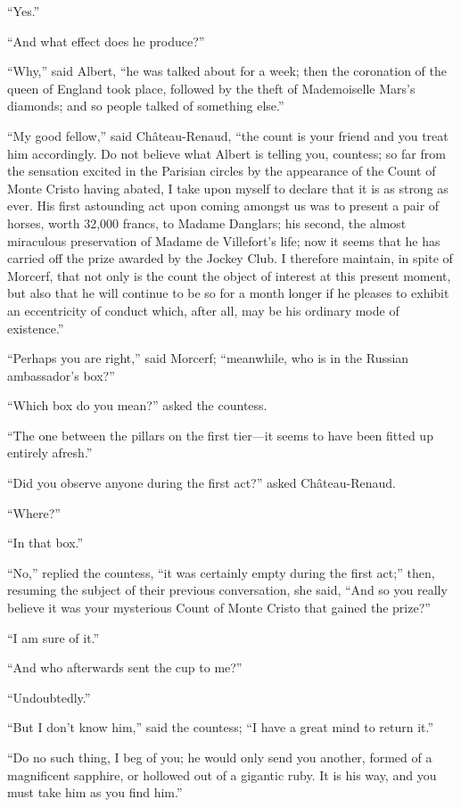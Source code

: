 “Yes.”

“And what effect does he produce?”

“Why,” said Albert, “he was talked about for a week; then the
coronation of the queen of England took place, followed by the theft of
Mademoiselle Mars’s diamonds; and so people talked of something else.”

“My good fellow,” said Château-Renaud, “the count is your friend and
you treat him accordingly. Do not believe what Albert is telling you,
countess; so far from the sensation excited in the Parisian circles by
the appearance of the Count of Monte Cristo having abated, I take upon
myself to declare that it is as strong as ever. His first astounding
act upon coming amongst us was to present a pair of horses, worth
32,000 francs, to Madame Danglars; his second, the almost miraculous
preservation of Madame de Villefort’s life; now it seems that he has
carried off the prize awarded by the Jockey Club. I therefore maintain,
in spite of Morcerf, that not only is the count the object of interest
at this present moment, but also that he will continue to be so for a
month longer if he pleases to exhibit an eccentricity of conduct which,
after all, may be his ordinary mode of existence.”

“Perhaps you are right,” said Morcerf; “meanwhile, who is in the
Russian ambassador’s box?”

“Which box do you mean?” asked the countess.

“The one between the pillars on the first tier—it seems to have been
fitted up entirely afresh.”

“Did you observe anyone during the first act?” asked Château-Renaud.

“Where?”

“In that box.”

“No,” replied the countess, “it was certainly empty during the first
act;” then, resuming the subject of their previous conversation, she
said, “And so you really believe it was your mysterious Count of Monte
Cristo that gained the prize?”

“I am sure of it.”

“And who afterwards sent the cup to me?”

“Undoubtedly.”

“But I don’t know him,” said the countess; “I have a great mind to
return it.”

“Do no such thing, I beg of you; he would only send you another, formed
of a magnificent sapphire, or hollowed out of a gigantic ruby. It is
his way, and you must take him as you find him.”

